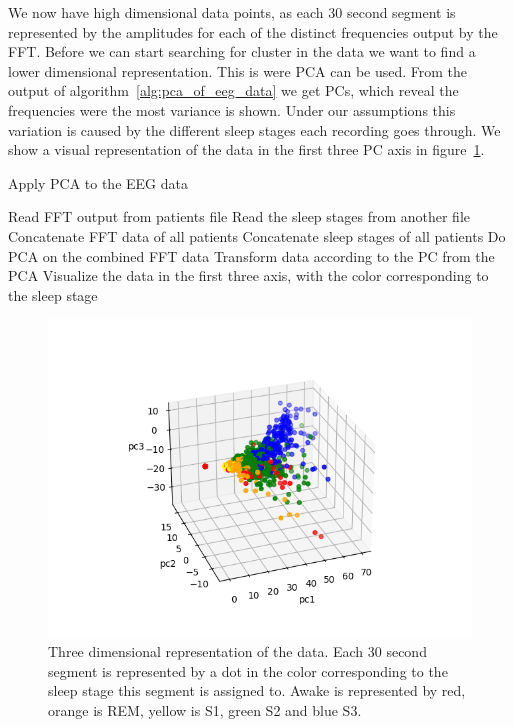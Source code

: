 We now have high dimensional data points, as each 30 second segment is represented by the amplitudes for each of the distinct frequencies output by the FFT. Before we can start searching for cluster in the data we want to find a lower dimensional representation. This is were PCA can be used. From the output of algorithm~\ref{alg:pca_of_eeg_data} we get PCs, which reveal the frequencies were the most variance is shown. Under our assumptions this variation is caused by the different sleep stages each recording goes through. We show a visual representation of the data in the first three PC axis in figure~\ref{fig:pca_output_3d}.

\begin{algorithm}
	\caption{Apply PCA to the EEG data}\label{alg:pca_of_eeg_data}
	\begin{algorithmic}
			\State Read FFT output from patients file
			\State Read the sleep stages from another file
		\EndFor
		\State Concatenate FFT data of all patients
		\State Concatenate sleep stages of all patients
		\State Do PCA on the combined FFT data
		\State Transform data according to the PC from the PCA
		\State Visualize the data in the first three axis, with the color corresponding to the sleep stage
	\end{algorithmic}
\end{algorithm}

\begin{figure}
	\centering
	\includegraphics[width=\linewidth]{figs/pca_output_3d}
	\caption{Three dimensional representation of the data. Each 30 second segment is represented by a dot in the color corresponding to the sleep stage this segment is assigned to. Awake is represented by red, orange is REM, yellow is S1, green S2 and blue S3.}
	\label{fig:pca_output_3d}
\end{figure}

